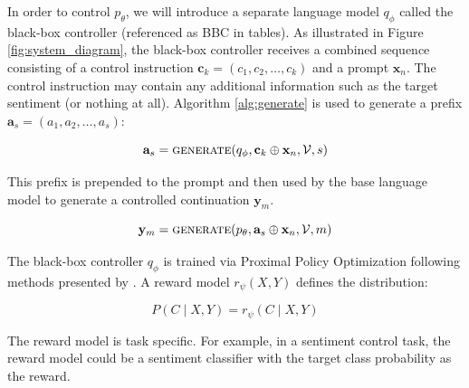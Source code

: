 \documentclass[phd,electronic,oneside,twosidetoc,letterpaper,chaptercenter,parttop,lof]{byumsphd}
\begin{document}
In order to control \(p_\theta\), we will introduce a separate language model \(q_\phi\) called the black-box controller (referenced as BBC in tables). As illustrated in Figure \ref{fig:system_diagram}, the black-box controller receives a combined sequence consisting of a control instruction \(\mathbf{c}_k = (c_1, c_2, \ldots, c_k)\) and a prompt \(\mathbf{x}_n\). The control instruction may contain any additional information such as the target sentiment (or nothing at all). Algorithm \ref{alg:generate} is used to generate a prefix \(\mathbf{a}_s = (a_1, a_2, \ldots, a_s)\):

\begin{equation}
    \mathbf{a}_s = \textrm{\textsc{generate}}(q_\phi, \mathbf{c}_k \oplus \mathbf{x}_n, \mathcal{V}, s)
\end{equation}

This prefix is prepended to the prompt and then used by the base language model to generate a controlled continuation \(\mathbf{y}_m\).

\begin{equation}
    \mathbf{y}_m = \textrm{\textsc{generate}}(p_\theta, \mathbf{a}_{s} \oplus \mathbf{x}_n, \mathcal{V}, m)
\end{equation}

The black-box controller \(q_\phi\) is trained via Proximal Policy Optimization \cite{schulman2017ppo} following methods presented by \citet{vonwerra2022trl}.
A reward model \(r_\psi(X, Y)\) defines the distribution:

\begin{equation}
    P(C \mid X, Y) = r_\psi(C \mid X, Y)
\end{equation}

The reward model is task specific. For example, in a sentiment control task, the reward model could be a sentiment classifier with the target class probability as the reward.

\end{document}
